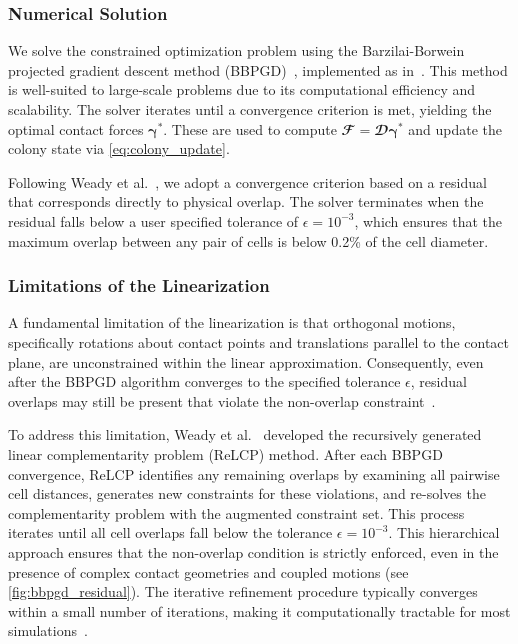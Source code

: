 \documentclass[conference]{IEEEtran}
\begin{document}
\subsubsection{Numerical Solution}

We solve the constrained optimization problem using the Barzilai-Borwein projected gradient descent method (BBPGD)~\cite{BBPGD}, implemented as in~\cite{Weady2024SM,Yan2019}. This method is well-suited to large-scale problems due to its computational efficiency and scalability. The solver iterates until a convergence criterion is met, yielding the optimal contact forces $\boldsymbol{\gamma}^*$. These are used to compute $\mathbfcal{F} = \mathbfcal{D}\boldsymbol{\gamma}^*$ and update the colony state via \autoref{eq:colony_update}.

Following Weady et al.~\cite{Weady2024SM}, we adopt a convergence criterion based on a residual that corresponds directly to physical overlap. The solver terminates when the residual falls below a user specified tolerance of $\epsilon = 10^{-3}$, which ensures that the maximum overlap between any pair of cells is below 0.2\% of the cell diameter.

\subsubsection{Limitations of the Linearization}

A fundamental limitation of the linearization is that orthogonal motions, specifically rotations about contact points and translations parallel to the contact plane, are unconstrained within the linear approximation. Consequently, even after the BBPGD algorithm converges to the specified tolerance $\epsilon$, residual overlaps may still be present that violate the non-overlap constraint~\cite{Weady2024SM}.

To address this limitation, Weady et al.~\cite{Weady2024SM} developed the recursively generated linear complementarity problem (ReLCP) method. After each BBPGD convergence, ReLCP identifies any remaining overlaps by examining all pairwise cell distances, generates new constraints for these violations, and re-solves the complementarity problem with the augmented constraint set. This process iterates until all cell overlaps fall below the tolerance $\epsilon = 10^{-3}$. This hierarchical approach ensures that the non-overlap condition is strictly enforced, even in the presence of complex contact geometries and coupled motions (see \autoref{fig:bbpgd_residual}). The iterative refinement procedure typically converges within a small number of iterations, making it computationally tractable for most simulations~\cite{Weady2024SM}.
\end{document}
